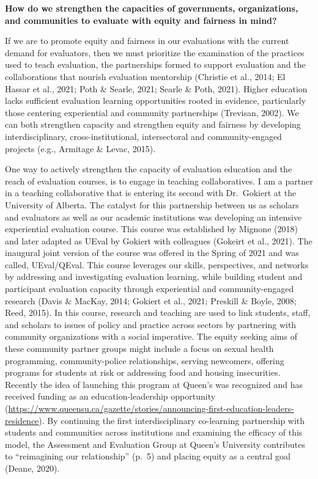 \documentclass[
]{book}
\begin{document}
\textbf{How do we strengthen the capacities of governments, organizations, and communities to evaluate with equity and fairness in mind?}

If we are to promote equity and fairness in our evaluations with the current demand for evaluators, then we must prioritize the examination of the practices used to teach evaluation, the partnerships formed to support evaluation and the collaborations that nourish evaluation mentorship (Christie et al., 2014; El Hassar et al., 2021; Poth \& Searle, 2021; Searle \& Poth, 2021). Higher education lacks sufficient evaluation learning opportunities rooted in evidence, particularly those centering experiential and community partnerships (Trevisan, 2002). We can both strengthen capacity and strengthen equity and fairness by developing interdisciplinary, cross-institutional, intersectoral and community-engaged projects (e.g., Armitage \& Levac, 2015).

One way to actively strengthen the capacity of evaluation education and the reach of evaluation courses, is to engage in teaching collaboratives. I am a partner in a teaching collaborative that is entering its second with Dr.~Gokiert at the University of Alberta. The catalyst for this partnership between us as scholars and evaluators as well as our academic institutions was developing an intensive experiential evaluation course. This course was established by Mignone (2018) and later adapted as UEval by Gokiert with colleagues (Gokeirt et al., 2021). The inaugural joint version of the course was offered in the Spring of 2021 and was called, UEval/QEval. This course leverages our skills, perspectives, and networks by addressing and investigating evaluation learning, while building student and participant evaluation capacity through experiential and community-engaged research (Davis \& MacKay, 2014; Gokiert et al., 2021; Preskill \& Boyle, 2008; Reed, 2015). In this course, research and teaching are used to link students, staff, and scholars to issues of policy and practice across sectors by partnering with community organizations with a social imperative. The equity seeking aims of these community partner groups might include a focus on sexual health programming, community-police relationships, serving newcomers, offering programs for students at risk or addressing food and housing insecurities. Recently the idea of launching this program at Queen's was recognized and has received funding as an education-leadership opportunity (\url{https://www.queensu.ca/gazette/stories/announcing-first-education-leaders-residence}). By continuing the first interdisciplinary co-learning partnership with students and communities across institutions and examining the efficacy of this model, the Assessment and Evaluation Group at Queen's University contributes to ``reimagining our relationship'' (p.~5) and placing equity as a central goal (Deane, 2020).
\end{document}
